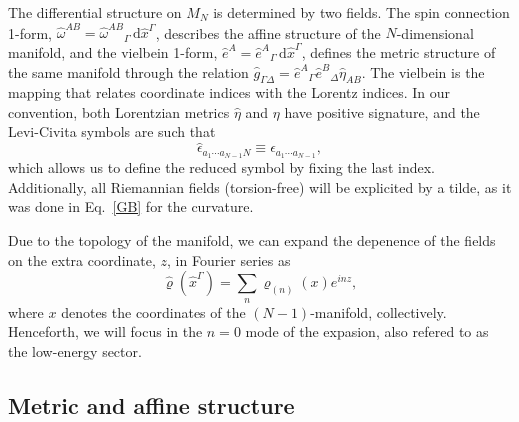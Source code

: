 \documentclass[aps,prd,12pt,superscriptaddress,showpacs,showkeys,longbibliography,reprint,nofootinbib]{revtex4-1}
\begin{document}
The differential structure on $M_N$ is determined by two fields. The spin connection 1-form, $\hat{\omega}^{AB} = \hat{\omega}^{AB}{}_{\Gamma}\,\text{d}\hat{x}^\Gamma$, describes the affine structure of the $N$-dimensional manifold, and the vielbein 1-form, $\hat{e}^A=\hat{e}^{A}{}_{\Gamma}\,\text{d}\hat{x}^\Gamma$, defines the metric structure of the same manifold through the relation $\hat{g}_{\Gamma\Delta} = \hat{e}^{A}{}_{\Gamma}\hat{e}^{B}{}_{\Delta}\hat{\eta}_{AB}$. The vielbein is the mapping that relates coordinate indices with the Lorentz indices.
In our convention, both Lorentzian metrics \(\hat{\eta}\) and \(\eta\) have positive signature, and the Levi-Civita symbols are such that
\[\hat{\epsilon}_{a_1 \cdots a_{N-1} N} \equiv \epsilon_{a_1 \cdots a_{N-1}},\]
which allows us to define the reduced symbol by fixing the last index. Additionally, all Riemannian fields (torsion-free) will be explicited by a tilde, as it was done in Eq.~\eqref{GB} for the curvature.

Due to the topology of the manifold, we can expand the depenence of the fields on the extra coordinate, $z$, in Fourier series as  
\begin{equation}
  \label{Fourier}
  \hat{\varrho}(\hat{x}^\Gamma)=\sum_n\varrho_{(n)}(x)e^{i n z},
\end{equation}
where $x$ denotes the coordinates of the $(N-1)$-manifold, collectively. Henceforth, we will focus in the $n=0$ mode of the expasion, also refered to as the low-energy sector.

\subsection{Metric and affine structure}
\end{document}
